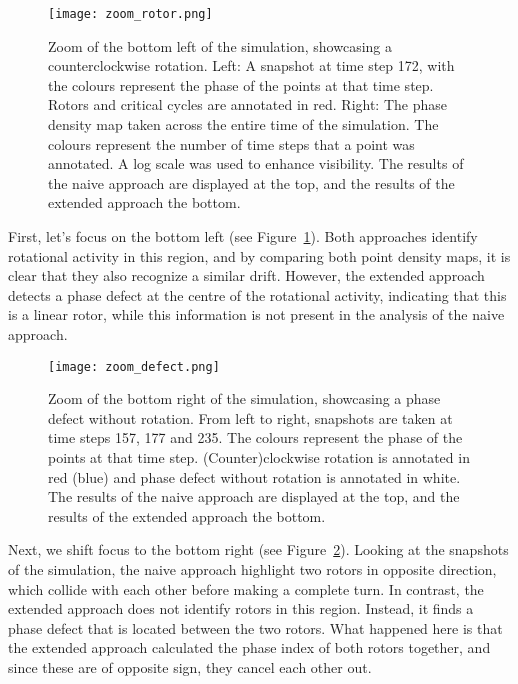 \documentclass[twocolumn]{article}
\begin{document}
\begin{figure}[ht]
  \centering
  \texttt{[image: zoom\_rotor.png]}
  \caption{Zoom of the bottom left of the simulation, showcasing a
    counterclockwise rotation. Left: A snapshot at time step 172, with the
    colours represent the phase of the points at that time step. Rotors and
    critical cycles are annotated in red. Right: The phase density map taken
    across the entire time of the simulation. The colours represent the
    number of time steps that a point was annotated. A log scale was used to
    enhance visibility. The results of the naive approach are displayed at
  the top, and the results of the extended approach the bottom.}
  \label{fig:zoom-rotor}
\end{figure}

First, let's focus on the bottom left (see Figure~\ref{fig:zoom-rotor}).
Both approaches identify rotational activity in this region, and by
comparing both point density maps, it is clear that they also recognize
a similar drift. However, the extended approach detects a phase defect
at the centre of the rotational activity, indicating that this is a
linear rotor, while this information is not present in the analysis of
the naive approach.

\begin{figure}[ht]
  \centering
  \texttt{[image: zoom\_defect.png]}
  \caption{Zoom of the bottom right of the simulation, showcasing a phase
    defect without rotation. From left to right, snapshots are taken at time
    steps 157, 177 and 235. The colours represent the phase of the points at
    that time step. (Counter)clockwise rotation is annotated in red (blue)
    and phase defect without rotation is annotated in white. The results of
    the naive approach are displayed at the top, and the results of the
  extended approach the bottom.}
  \label{fig:zoom-defect}
\end{figure}

Next, we shift focus to the bottom right (see
Figure~\ref{fig:zoom-defect}). Looking at the snapshots of the simulation,
the naive approach highlight two rotors in opposite direction, which
collide with each other before making a complete turn. In contrast, the
extended approach does not identify rotors in this region. Instead, it
finds a phase defect that is located between the two rotors. What
happened here is that the extended approach calculated the phase index
of both rotors together, and since these are of opposite sign, they
cancel each other out.
\end{document}

